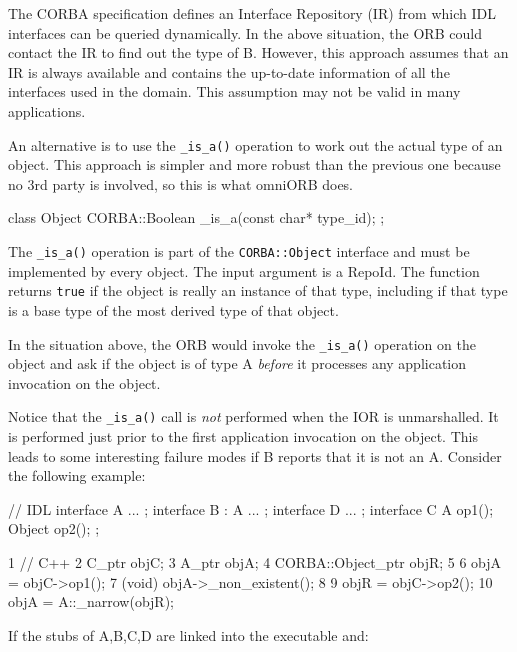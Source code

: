 \documentclass[11pt,oneside,a4paper]{book}
\newcommand{\intf}[1]{\texttt{#1}}
\newcommand{\code}[1]{\texttt{#1}}
\newcommand{\op}[1]{\texttt{#1()}}
\begin{document}
The CORBA specification defines an Interface Repository (IR) from
which IDL interfaces can be queried dynamically. In the above
situation, the ORB could contact the IR to find out the type of B.
However, this approach assumes that an IR is always available and
contains the up-to-date information of all the interfaces used in the
domain. This assumption may not be valid in many applications.

An alternative is to use the \op{\_is\_a} operation to work out the
actual type of an object. This approach is simpler and more robust
than the previous one because no 3rd party is involved, so this is
what omniORB does.

\begin{cxxlisting}
class Object{
    CORBA::Boolean _is_a(const char* type_id);
};
\end{cxxlisting}

The \op{\_is\_a} operation is part of the \intf{CORBA::Object}
interface and must be implemented by every object. The input argument
is a RepoId. The function returns \code{true} if the object is really
an instance of that type, including if that type is a base type of the
most derived type of that object.

In the situation above, the ORB would invoke the \op{\_is\_a}
operation on the object and ask if the object is of type A
\emph{before} it processes any application invocation on the object.

Notice that the \op{\_is\_a} call is \emph{not} performed when the IOR
is unmarshalled. It is performed just prior to the first application
invocation on the object. This leads to some interesting failure modes
if B reports that it is not an A. Consider the following example:

\begin{idllisting}
// IDL
interface A { ... };
interface B : A { ... };
interface D { ... };
interface C {
  A      op1();
  Object op2();
};
\end{idllisting}

\lstset{numbers=left,gobble=4}
\begin{cxxlisting}
 1  // C++
 2  C_ptr objC;
 3  A_ptr objA;
 4  CORBA::Object_ptr objR;
 5
 6  objA =  objC->op1();
 7  (void) objA->_non_existent();
 8
 9  objR =  objC->op2();
10  objA =  A::_narrow(objR);
\end{cxxlisting}
\lstset{numbers=none,gobble=0}

\noindent If the stubs of A,B,C,D are linked into the executable and:
\end{document}
